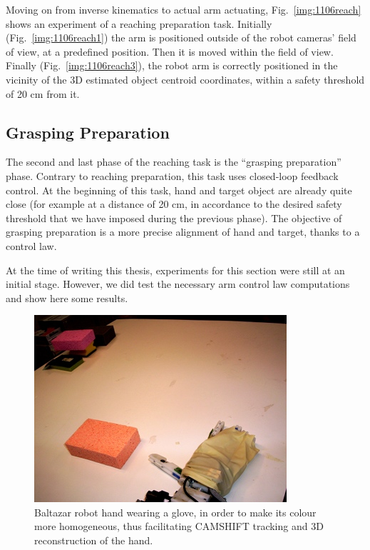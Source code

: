 Moving on from inverse kinematics to actual arm actuating, Fig.~\ref{img:1106reach} shows an experiment of a reaching preparation task. Initially (Fig.~\ref{img:1106reach1}) the arm is positioned outside of the robot cameras' field of view, at a predefined position. Then it is moved within the field of view. Finally (Fig.~\ref{img:1106reach3}), the robot arm is correctly positioned in the vicinity of the 3D estimated object centroid coordinates, within a safety threshold of 20 cm from it.

\subsection{Grasping Preparation}

The second and last phase of the reaching task is the ``grasping preparation'' phase. Contrary to reaching preparation, this task uses closed-loop feedback control. At the beginning of this task, hand and target object are already quite close (for example at a distance of 20 cm, in accordance to the desired safety threshold that we have imposed during the previous phase). The objective of grasping preparation is a more precise alignment of hand and target, thanks to a control law.

At the time of writing this thesis, experiments for this section were still at an initial stage. However, we did test the necessary arm control law computations and show here some results.

\begin{figure}
\centering
\includegraphics{figures/0619glove}
\caption[Robot hand wearing a glove]{Baltazar robot hand wearing a glove, in order to make its colour more homogeneous, thus facilitating \acs{CAMSHIFT} tracking and 3D reconstruction of the hand.}
\label{img:0619glove}
\end{figure}

